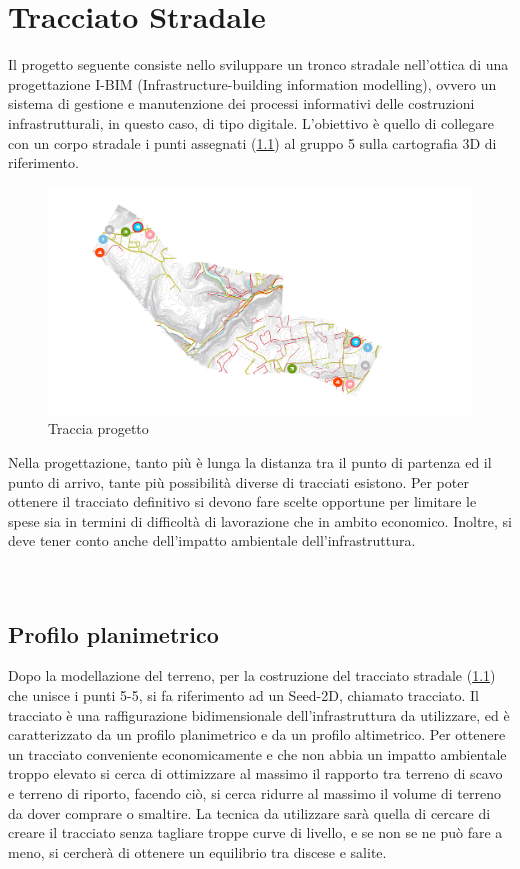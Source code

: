 \chapter{Tracciato Stradale}

Il progetto seguente consiste nello sviluppare un tronco stradale nell’ottica di una progettazione I-BIM
(Infrastructure-building information modelling), ovvero un sistema di gestione e manutenzione dei processi
informativi delle costruzioni infrastrutturali, in questo caso, di tipo digitale. L'obiettivo è quello di
collegare con un corpo stradale i punti assegnati (\ref{tracciaprogetto}) al gruppo 5 sulla cartografia 3D di riferimento.

\begin{figure}[H]
    \includegraphics[width=\textwidth]{Figures/Traccia progetto.png}
      \caption{Traccia progetto}
      \label{tracciaprogetto}
\end{figure}

Nella progettazione, tanto più è lunga la distanza tra il punto di partenza ed il punto di arrivo, tante
più possibilità diverse di tracciati esistono. Per poter ottenere il tracciato definitivo si devono fare scelte
opportune per limitare le spese sia in termini di difficoltà di lavorazione che in ambito economico. Inoltre,
si deve tener conto anche dell'impatto ambientale dell'infrastruttura.
\leavevmode\\
\leavevmode\\
\leavevmode\\
\section{Profilo planimetrico}

Dopo la modellazione del terreno, per la costruzione del tracciato stradale (\ref{tracciaprogetto}) che unisce i punti 5-5, si fa riferimento ad un Seed-2D, chiamato tracciato. 
Il tracciato è una raffigurazione bidimensionale dell'infrastruttura da utilizzare, ed è caratterizzato da un profilo planimetrico e da un profilo altimetrico. Per ottenere un tracciato conveniente economicamente e che non abbia un impatto ambientale troppo elevato si cerca di ottimizzare al massimo il rapporto tra terreno di scavo e terreno di riporto, facendo ciò, si cerca ridurre al massimo il volume di terreno da dover comprare o smaltire. La tecnica da utilizzare sarà quella di cercare di creare il tracciato senza tagliare troppe curve di livello, e se non se ne può fare a meno, si cercherà di ottenere un equilibrio tra discese e salite.

